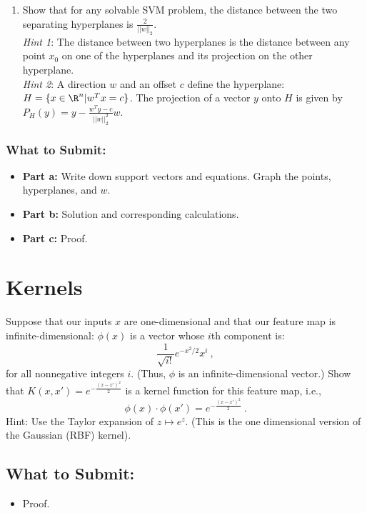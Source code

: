 \documentclass{article}
\begin{document}
\begin{aprob}
\begin{enumerate}
        \item {} Show that for any solvable SVM problem, the distance between the two separating hyperplanes is $\frac{2}{||w||_2}$. \\
        
        \textit{Hint 1}: The distance between two hyperplanes is the distance between any point $x_0$ on one of the hyperplanes and its projection on the other hyperplane. \\
        \textit{Hint 2}: A direction $w$ and an offset $c$ define the hyperplane: $H = \{x \in \R^n | w^Tx = c\}$. The projection of a vector $y$ onto $H$ is given by $P_H(y) = y - \frac{w^Ty - c}{||w||^2_2}w$.
    \end{enumerate}
    \subsubsection*{What to Submit:}
    \begin{itemize}
        \item \textbf{Part a:} Write down support vectors and equations. Graph the points, hyperplanes, and $w$.
        \item \textbf{Part b:} Solution and corresponding calculations.
        \item \textbf{Part c:} Proof.
    \end{itemize}
\end{aprob}

\section*{Kernels}
\begin{aprob}
     Suppose that our inputs $x$ are one-dimensional and that our feature map is infinite-dimensional: 
    $\phi( x) $ is a vector whose $i$th component is:
    $$\frac{1}{\sqrt{i!}} e^{-x^2/2}x^i\ ,$$
    for all nonnegative integers $i$. (Thus, $\phi$ is an infinite-dimensional vector.)
    Show that $K(x, x') = e^{-\frac{(x-x')^2}{2}}$ is a kernel function for this feature map, i.e., 
    $$\phi (x) \cdot \phi (x') = e^{-\frac{(x-x')^2}{2}}\ .$$
    Hint: Use the Taylor expansion of $z \mapsto e^z$.
    (This is the one dimensional version of the Gaussian  (RBF) kernel).
    \subsection*{What to Submit:}
    \begin{itemize}
        \item Proof.
    \end{itemize}
\end{aprob}
\end{document}
